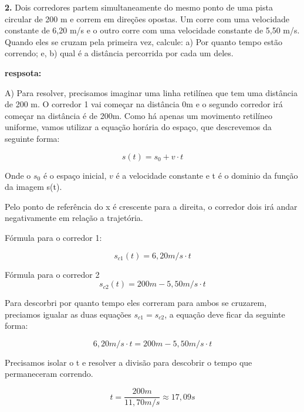 \documentclass[a4paper, 12pt]{article}
\begin{document}
\begin{flushleft}
		\vspace{2em}
		
		\textbf{2.} Dois corredores partem simultaneamente do mesmo ponto de uma pista circular de 200 m e correm em direções opostas. Um corre com uma velocidade constante de 6,20 m/s e o outro corre com uma velocidade  constante de 5,50 m/s. Quando eles se cruzam pela primeira vez, calcule: a) Por quanto tempo estão correndo; e, b) qual é a distância percorrida por cada um deles.
		
		\textbf{respsota: }
		
		A) Para resolver, precisamos imaginar uma linha retilínea que tem uma distância de 200 m. O corredor 1 vai começar na distância 0m e o segundo corredor irá começar na distância é de 200m. Como há apenas um movimento retilíneo uniforme, vamos utilizar a equação horária do espaço, que descrevemos da seguinte forma:
		
		\begin{equation*}
			s(t) = s_0 + v \cdot t
		\end{equation*}
		
		Onde o $s_0$ é o espaço inicial, $v$ é a velocidade constante e t é o dominio da função da imagem s(t).
		
		Pelo ponto de referência do x é crescente para a direita, o corredor dois irá andar negativamente em relação a trajetória.
		
		Fórmula para o corredor 1:
		
		\begin{equation*}
			s_{c1}(t) = 6,20m/s \cdot t
		\end{equation*}
		
		Fórmula para o corredor 2
		\begin{equation*}
			s_{c2}(t) = 200m - 5,50m/s \cdot t
		\end{equation*}
		
		Para descorbri por quanto tempo eles correram para ambos se cruzarem, preciamos igualar as duas equações $s_{c1} = s_{c2}$, a equação deve ficar da seguinte forma:
		
		\begin{equation*}
			6,20m/s \cdot t = 200m - 5,50m/s \cdot t
		\end{equation*}
		
		Precisamos isolar o t e resolver a divisão para descobrir o tempo que permaneceram correndo.
		
		\begin{equation*}
			t= \frac{200m}{11,70m/s} \approx 17,09s
		\end{equation*}
		

\end{flushleft}
\end{document}
